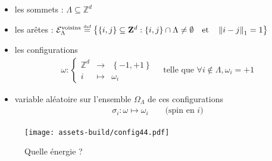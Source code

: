 \documentclass[french]{beamer}
\newcommand\eqdef{\overset{\mbox{\tiny def}}{=}}
\begin{document}
\begin{frame}
    \begin{itemize}
        \item les sommets : \(\Lambda \subseteq \mathbb{Z}^d \)
        \item les arêtes : \(\mathcal{E}_\Lambda^\text{voisins} \eqdef\left\{  
        \left\{i,j\right\} \subseteq  \mathbf{Z}^d : \left\{i,j\right\} \cap \Lambda \neq \emptyset
        \quad \text{et} \quad
        \left\Vert i - j \right\Vert_1 = 1
        \right\} \)
        \item les configurations
       	\begin{align*}
	        \omega : \left\{
	        \begin{array}{ccc}
	        \mathbb{Z}^d & \longrightarrow & \left\{-1, +1\right\} \\
	        i                         & \longmapsto       & \omega_i
	        \end{array}
	        \right. \quad \text{telle que \(\forall i \notin \Lambda, \omega_i = +1\)}
        \end{align*}
        \item variable aléatoire sur l'ensemble $\Omega_\Lambda$ de ces configurations
        \begin{align*}
        	\sigma_i : \omega \mapsto \omega_i \qquad \text{(spin en $i$)}
        \end{align*}
    \end{itemize}
\end{frame}




\begin{frame}
\begin{figure}
	\centering
	\texttt{[image: assets-build/config44.pdf]}
	\caption{Quelle énergie ?}
\end{figure}
\end{frame}
\end{document}
